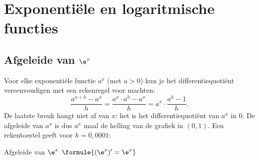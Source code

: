 \begin{oefeningen}
\end{oefeningen}

\section{Exponentiële en logaritmische functies}

\subsection{Afgeleide van \texorpdfstring{$\e^x$}{e tot de x}}

Voor elke exponentiële functie $a^x$ (met $a > 0$) kun je het differentiequotiënt vereenvoudigen met een rekenregel voor machten:
\[\frac{a^{x + h} - a^x}{h} = \frac{a^x \cdot a^h - a^x}{h} = a^x \cdot \frac{a^h - 1}{h} .\]
De laatste breuk hangt niet af van $x$: het is het differentiequotiënt van $a^x$ in $0$. De afgeleide van $a^x$ is dus $a^x$ maal de helling van de grafiek in $(0, 1)$. Een rekentoestel geeft voor $h = 0{,}0001$:


\begin{theorie}
\begin{stelling}{Afgeleide van \texorpdfstring{$\e^x$}{e tot de x}}
$\formule{(\e^x)' = \e^x}$
\end{stelling}
\end{theorie}

